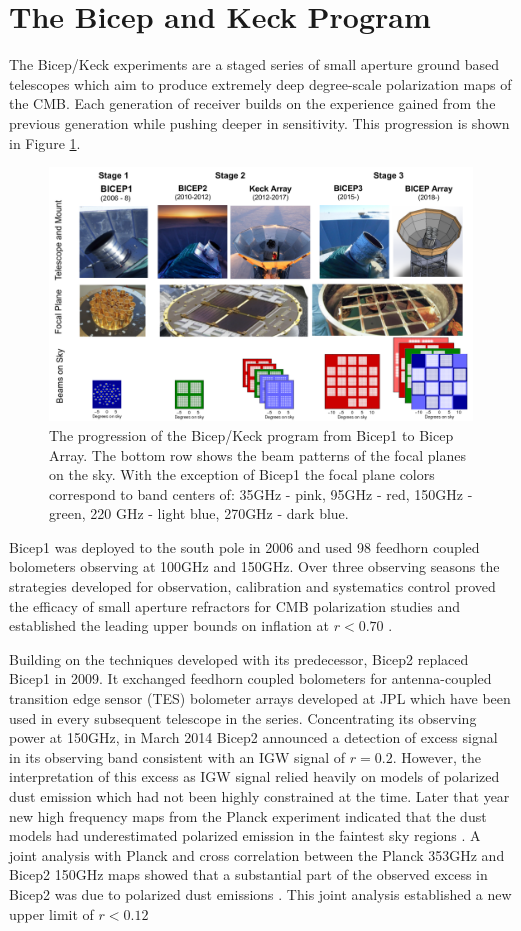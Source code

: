 \documentclass[12pt]{article}
\begin{document}
\section{The Bicep and Keck Program}
The Bicep/Keck experiments are a staged series of small aperture ground based
telescopes which aim to produce extremely deep degree-scale polarization maps
of the CMB. Each generation of receiver builds on the experience gained from
the previous generation while pushing deeper in sensitivity. This progression
is shown in Figure \ref{fig:BK_progression}.
\begin{figure}
	\center
	\includegraphics[width=.8\textwidth]{BK_progression.png}
	\caption{The progression of the Bicep/Keck program from Bicep1 to Bicep
	Array. The bottom row shows the beam patterns of the focal planes on the
	sky. With the exception of Bicep1 the focal plane colors correspond to
	band centers of: 35GHz - pink, 95GHz - red, 150GHz - green, 220 GHz -
	light blue, 270GHz - dark blue.}
	\label{fig:BK_progression}
\end{figure}



Bicep1 was deployed to the south pole in 2006 and used 98 feedhorn coupled
bolometers observing at 100GHz and 150GHz. Over three observing seasons the
strategies developed for observation, calibration and systematics control
proved the efficacy of small aperture refractors for CMB polarization studies
and established the leading upper bounds on inflation at $r<0.70$
\cite{cite:Bicep1}.

Building on the techniques developed with its predecessor, Bicep2 replaced
Bicep1 in 2009. It exchanged feedhorn coupled bolometers for antenna-coupled
transition edge sensor (TES) bolometer arrays developed at JPL which have been
used in every subsequent telescope in the series. Concentrating its observing
power at 150GHz, in March 2014 Bicep2 announced a detection of excess signal
in its observing band consistent with an IGW signal of $r=0.2$\cite{cite:BK1}.
However, the interpretation of this excess as IGW signal relied heavily on
models of polarized dust emission which had not been highly constrained at the
time. Later that year new high frequency maps from the Planck experiment
indicated that the dust models had underestimated polarized emission in the
faintest sky regions \cite{cite:PlanckXIX}. A joint analysis with Planck and
cross correlation between the Planck 353GHz and Bicep2 150GHz maps showed that
a substantial part of the observed excess in Bicep2 was due to polarized dust
emissions \cite{cite:BKP}. This joint analysis established a new upper limit
of $r<0.12$
\end{document}

